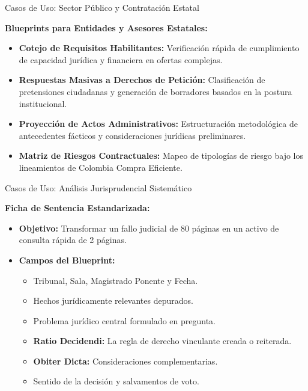 \documentclass[aspectratio=169]{beamer}
\begin{document}
\begin{frame}{Casos de Uso: Sector Público y Contratación Estatal}

\textbf{Blueprints para Entidades y Asesores Estatales:}
\begin{itemize}
  \item \textbf{Cotejo de Requisitos Habilitantes:} Verificación rápida de cumplimiento de capacidad jurídica y financiera en ofertas complejas.
  \item \textbf{Respuestas Masivas a Derechos de Petición:} Clasificación de pretensiones ciudadanas y generación de borradores basados en la postura institucional.
  \item \textbf{Proyección de Actos Administrativos:} Estructuración metodológica de antecedentes fácticos y consideraciones jurídicas preliminares.
  \item \textbf{Matriz de Riesgos Contractuales:} Mapeo de tipologías de riesgo bajo los lineamientos de Colombia Compra Eficiente.
\end{itemize}
\end{frame}

\begin{frame}{Casos de Uso: Análisis Jurisprudencial Sistemático}

\textbf{Ficha de Sentencia Estandarizada:}
\begin{itemize}
  \item \textbf{Objetivo:} Transformar un fallo judicial de 80 páginas en un activo de consulta rápida de 2 páginas.
  \item \textbf{Campos del Blueprint:}
  \begin{itemize}
    \item Tribunal, Sala, Magistrado Ponente y Fecha.
    \item Hechos jurídicamente relevantes depurados.
    \item Problema jurídico central formulado en pregunta.
    \item \textbf{Ratio Decidendi:} La regla de derecho vinculante creada o reiterada.
    \item \textbf{Obiter Dicta:} Consideraciones complementarias.
    \item Sentido de la decisión y salvamentos de voto.
  \end{itemize}
\end{itemize}
\end{frame}
\end{document}
